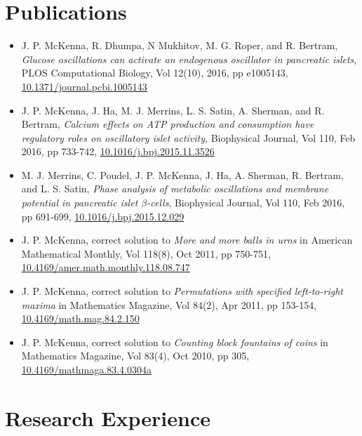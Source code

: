 \documentclass[11pt]{cv}
\begin{document}
\section*{Publications}
\label{sec:orgheadline6}
\begin{itemize}
\item J. P. McKenna, R. Dhumpa, N Mukhitov, M. G. Roper, and R. Bertram, \emph{Glucose oscillations can activate an endogenous oscillator in pancreatic islets}, PLOS Computational Biology, Vol 12(10), 2016, pp e1005143, \href{http://dx.doi.org/10.1371/journal.pcbi.1005143}{10.1371/journal.pcbi.1005143}\\
\item J. P. McKenna, J. Ha, M. J. Merrins, L. S. Satin, A. Sherman, and R. Bertram, \emph{Calcium effects on ATP production and consumption have regulatory roles on oscillatory islet activity}, Biophysical Journal, Vol 110, Feb 2016, pp 733-742, \href{http://dx.doi.org/10.1016/j.bpj.2015.11.3526}{10.1016/j.bpj.2015.11.3526}\\
\item M. J. Merrins, C. Poudel, J. P. McKenna, J. Ha, A. Sherman, R. Bertram, and L. S. Satin, \emph{Phase analysis of metabolic oscillations and membrane potential in pancreatic islet \(\beta\)-cells}, Biophysical Journal, Vol 110, Feb 2016, pp 691-699, \href{http://dx.doi.org/10.1016/j.bpj.2015.12.029}{10.1016/j.bpj.2015.12.029}\\
\item J. P. McKenna, correct solution to \emph{More and more balls in urns} in American Mathematical Monthly, Vol 118(8), Oct 2011, pp 750-751, \href{http://dx.doi.org/10.4169/amer.math.monthly.118.08.747}{10.4169/amer.math.monthly.118.08.747}\\
\item J. P. McKenna, correct solution to \emph{Permutations with specified left-to-right maxima} in Mathematics Magazine, Vol 84(2), Apr 2011, pp 153-154, \href{http://dx.doi.org/10.4169/math.mag.84.2.150}{10.4169/math.mag.84.2.150}\\
\item J. P. McKenna, correct solution to \emph{Counting block fountains of coins} in Mathematics Magazine, Vol 83(4), Oct 2010, pp 305, \href{http://www.jstor.org/stable/10.4169/mathmaga.83.4.0304a}{10.4169/mathmaga.83.4.0304a}\\
\end{itemize}
\section*{Research Experience}
\label{sec:orgheadline10}
\end{document}
